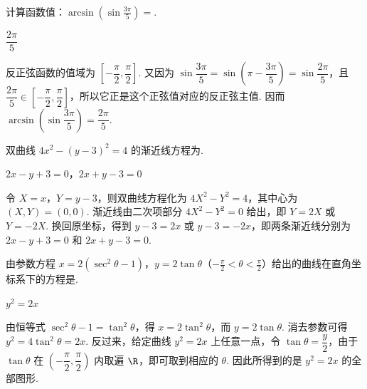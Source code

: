 \begin{problem}
计算函数值：\(\arcsin\left(\sin\frac{3\pi}{5}\right)=\)\fillinblank{}.
\end{problem}

\begin{answer}
\(\dfrac{2\pi}{5}\)
\end{answer}

\begin{solution}
反正弦函数的值域为 \(\left[-\dfrac{\pi}{2},\dfrac{\pi}{2}\right]\). 又因为
\(\sin\dfrac{3\pi}{5}=\sin\left(\pi-\dfrac{3\pi}{5}\right)=\sin\dfrac{2\pi}{5}\)，且 \(\dfrac{2\pi}{5}\in\left[-\dfrac{\pi}{2},\dfrac{\pi}{2}\right]\)，所以它正是这个正弦值对应的反正弦主值. 因而 \(\arcsin\left(\sin\dfrac{3\pi}{5}\right)=\dfrac{2\pi}{5}\).
\end{solution}

\begin{problem}
双曲线 \(4x^2-\left(y-3\right)^2=4\) 的渐近线方程为\fillinblank{}.
\end{problem}

\begin{answer}
\(2x-y+3=0\)，\(2x+y-3=0\)
\end{answer}

\begin{solution}
令 \(X=x\)，\(Y=y-3\)，则双曲线方程化为 \(4X^2-Y^2=4\)，其中心为 \((X,Y)=(0,0)\). 渐近线由二次项部分 \(4X^2-Y^2=0\) 给出，即 \(Y=2X\) 或 \(Y=-2X\). 换回原坐标，得到 \(y-3=2x\) 或 \(y-3=-2x\)，即两条渐近线分别为 \(2x-y+3=0\) 和 \(2x+y-3=0\).
\end{solution}

\begin{problem}
由参数方程 \(x=2\left(\sec^2\theta-1\right)\)，\(y=2\tan\theta\)（\(-\frac{\pi}{2}<\theta<\frac{\pi}{2}\)）给出的曲线在直角坐标系下的方程是\fillinblank{}.
\end{problem}

\begin{answer}
\(y^2=2x\)
\end{answer}

\begin{solution}
由恒等式 \(\sec^2\theta-1=\tan^2\theta\)，得 \(x=2\tan^2\theta\)，而 \(y=2\tan\theta\). 消去参数可得 \(y^2=4\tan^2\theta=2x\). 反过来，给定曲线 \(y^2=2x\) 上任意一点，令 \(\tan\theta=\dfrac{y}{2}\)，由于 \(\tan\theta\) 在 \(\left(-\dfrac{\pi}{2},\dfrac{\pi}{2}\right)\) 内取遍 \(\R\)，即可取到相应的 \(\theta\). 因此所得到的是 \(y^2=2x\) 的全部图形.
\end{solution}


